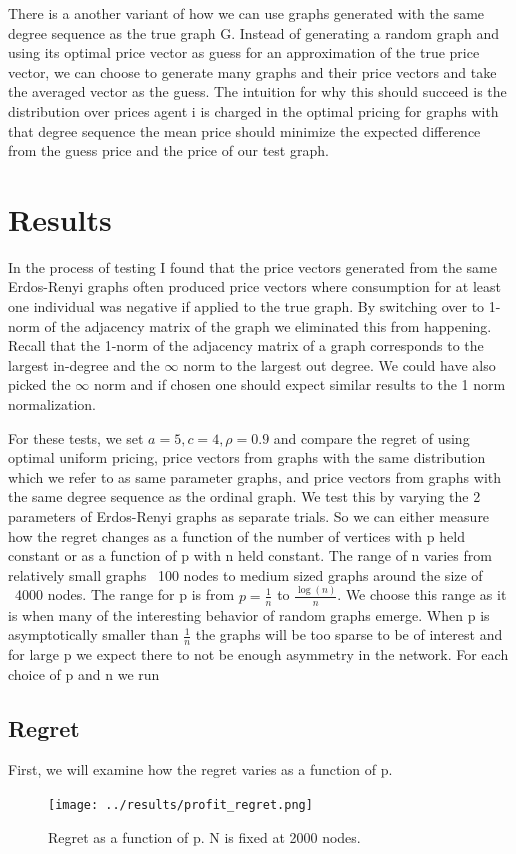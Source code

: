 \documentclass[12pt]{article}
\begin{document}
There is a another variant of how we can use graphs generated with the same degree sequence as the true graph G. Instead of generating a random graph and using its optimal price vector as guess for an approximation of the true price vector, we can choose to generate many graphs and their price vectors and take the averaged vector as the guess. The intuition for why this should succeed is the distribution over prices agent i is charged in the optimal pricing for graphs with that degree sequence the mean price should minimize the expected difference from the guess price and the price of our test graph.

\section{Results}
In the process of testing I found that the price vectors generated from the same Erdos-Renyi graphs often produced price vectors where consumption for at least one individual was negative if applied to the true graph. By switching over to 1-norm of the adjacency matrix of the graph we eliminated this from happening. Recall that the 1-norm of the  adjacency matrix of a graph corresponds to the largest in-degree and the $\infty$ norm to the largest out degree. We could have also picked the $\infty$ norm and if chosen one should expect similar results to the 1 norm normalization.

For these tests, we set $a= 5, c=4, \rho=0.9$ and compare the regret of using optimal uniform pricing, price vectors from graphs with the same distribution which we refer to as same parameter graphs, and price vectors from graphs with the same degree sequence as the ordinal graph. We test this by varying the 2 parameters of Erdos-Renyi graphs as separate trials. So we can either measure how the regret changes as a function of the number of vertices with p held constant or as a function of p with n held constant. The range of n varies from relatively small graphs ~100 nodes to medium sized graphs around the size of ~4000 nodes. The range for p is from $p=\frac{1}{n}$ to $\frac{\log(n)}{n}$. We choose this range as it is when many of the interesting behavior of random graphs emerge. When p is asymptotically smaller than $\frac{1}{n}$ the graphs will be too sparse to be of interest and for large p we expect there to not be enough asymmetry in the network. For each choice of p and n we run

\subsection{Regret}
First, we will examine how the regret varies as a function of p.
\begin{figure}[h]
  \centering
  \texttt{[image: ../results/profit\_regret.png]}
  \caption{Regret as a function of p. N is fixed at 2000 nodes. }
\end{figure}
\end{document}
